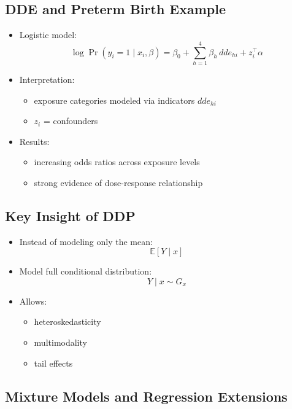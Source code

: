 \documentclass[12pt,oneside]{book}
\numberwithin{equation}{section}
\theoremstyle{definition}
\theoremstyle{plain}
\theoremstyle{remark}
\begin{document}
\subsection*{DDE and Preterm Birth Example}

\begin{itemize}
\item Logistic model:
\[
\log \Pr(y_i=1 \mid x_i,\beta)
=
\beta_0 + \sum_{h=1}^4 \beta_h\, dde_{hi} + z_i^\top \alpha
\]

\item Interpretation:
\begin{itemize}
\item exposure categories modeled via indicators $dde_{hi}$
\item $z_i$ = confounders
\end{itemize}

\item Results:
\begin{itemize}
\item increasing odds ratios across exposure levels
\item strong evidence of dose-response relationship
\end{itemize}
\end{itemize}

\subsection*{Key Insight of DDP}

\begin{itemize}
\item Instead of modeling only the mean:
\[
\mathbb{E}[Y \mid x]
\]

\item Model full conditional distribution:
\[
Y \mid x \sim G_x
\]

\item Allows:
\begin{itemize}
\item heteroskedasticity
\item multimodality
\item tail effects
\end{itemize}
\end{itemize}

\subsection*{Mixture Models and Regression Extensions}
\end{document}

